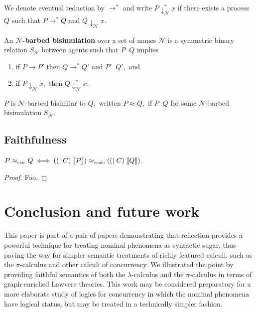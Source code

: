 \documentclass[a4paper,UKenglish]{lipics-v2016}
\newcommand{\Ncal}{\mathcal{N}}
\newcommand{\interp}[1]{\llbracket #1 \rrbracket}
\newcommand{\pic}{$\pi$-calculus}
\begin{document}
We denote eventual reduction by $\to^*$ and write $P \downarrow^*_\Ncal x$ if there exists a process $Q$ such that $P \to^* Q$ and $Q \downarrow_\Ncal x.$

An {\bf $\Ncal$-barbed bisimulation} over a set of names $\Ncal$ is a symmetric binary relation $S_\Ncal$ between agents such that $P \mathop{S_\Ncal} Q$ implies
\begin{enumerate}
  \item if $P \to P'$ then $Q \to^* Q'$ and $P' \mathop{S_\Ncal} Q',$ and 
  \item if $P \downarrow_\Ncal x,$ then $Q \downarrow^*_\Ncal x.$
\end{enumerate}
$P$ is $\Ncal$-barbed bisimilar to $Q,$ written $P \approx Q,$ if $P \mathop{S_\Ncal} Q$ for some $\Ncal$-barbed bisimulation $S_\Ncal.$

\subsection{Faithfulness}
\begin{theorem}
  $P \approx_{\mbox{\tiny calc}} Q \iff  ((|\; C)\; \interp{P}) \approx_{\mbox{\tiny comb}} ((|\; C)\; \interp{Q})$.
\end{theorem}

\begin{proof}
  Foo.
\end{proof}
\section{Conclusion and future work}
This paper is part of a pair of papers demonstrating that reflection
provides a powerful technique for treating nominal phenomena as
syntactic sugar, thus paving the way for simpler semantic treatments
of richly featured calculi, such as the {\pic} and other calculi of
concurrency. We illustrated the point by providing faithful semantics
of both the $\lambda$-calculus and the {\pic} in terms of graph-enriched
Lawvere theories. This work may be considered preparatory for a more
elaborate study of logics for concurrency in which the nominal
phenomena have logical status, but may be treated in a technically
simpler fashion.
\end{document}
